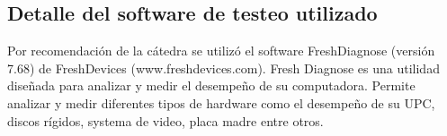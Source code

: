 \subsection{Detalle del software de testeo utilizado}
Por recomendación de la cátedra se utilizó el software FreshDiagnose (versión 
7.68) de FreshDevices (www.freshdevices.com).
Fresh Diagnose es una utilidad diseñada para analizar y medir el desempeño de 
su computadora. Permite analizar y medir diferentes tipos de hardware como el 
desempeño de su UPC, discos rígidos, systema de video, placa madre entre otros.


